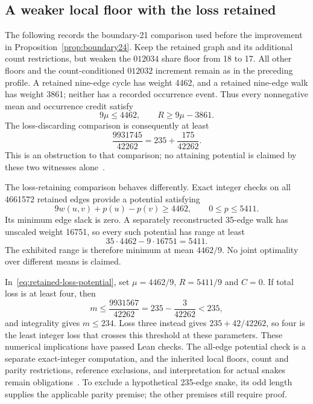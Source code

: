 \documentclass[11pt,a4paper]{article}
\theoremstyle{definition}
\theoremstyle{remark}
\begin{document}
\subsection{A weaker local floor with the loss retained}\label{sec:retained-loss-comparison}
The following records the boundary-21 comparison used before the improvement
in Proposition~\ref{prop:boundary24}. Keep the retained graph and its additional count restrictions, but weaken
the $012034$ share floor from 18 to 17. All other floors and the
count-conditioned $012032$ increment remain as in the preceding profile.
A retained nine-edge cycle has weight 4462, and a retained nine-edge walk
has weight 3861; neither has a recorded occurrence event. Thus every
nonnegative mean and occurrence credit satisfy
\[
9\mu\le4462,\qquad R\ge9\mu-3861.
\]
The loss-discarding comparison is consequently at least
\[
\frac{9931745}{42262}=235+\frac{175}{42262}.
\]
This is an obstruction to that comparison; no attaining potential is
claimed by these two witnesses alone~\cite{floor158archive}.

The loss-retaining comparison behaves differently. Exact integer checks
on all 4661572 retained edges provide a potential satisfying
\[
9w(u,v)+p(u)-p(v)\ge4462,\qquad 0\le p\le5411.
\]
Its minimum edge slack is zero. A separately reconstructed 35-edge walk
has unscaled weight 16751, so every such potential has range at least
\[
35\cdot4462-9\cdot16751=5411.
\]
The exhibited range is therefore minimum at mean $4462/9$. No joint
optimality over different means is claimed.

In~\eqref{eq:retained-loss-potential}, set $\mu=4462/9$, $R=5411/9$
and $C=0$. If total loss is at least four, then
\[
m\le\frac{9931567}{42262}=235-\frac3{42262}<235,
\]
and integrality gives $m\le234$. Loss three instead gives
$235+42/42262$, so four is the least integer loss that crosses this
threshold at these parameters. These numerical implications have passed
Lean checks. The all-edge potential check is a separate exact-integer
computation, and the inherited local floors, count and parity restrictions,
reference exclusions, and interpretation for actual snakes remain
obligations~\cite{loss164archive,threshold165archive}.
To exclude a hypothetical 235-edge snake, its odd length supplies the
applicable parity premise; the other premises still require proof.
\end{document}
